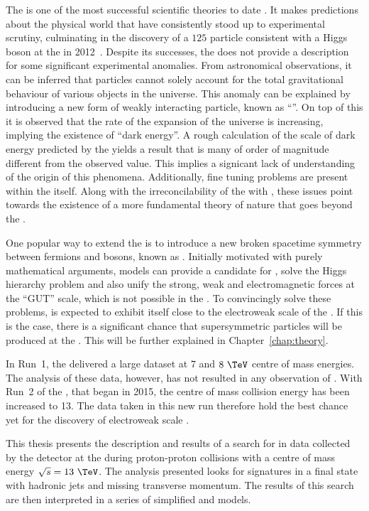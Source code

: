 The \SM is one of the most successful scientific theories to date
\cite{Salam:1964ry,Glashow:1961tr,PhysRevLett.19.1264}. It makes
predictions about the physical world that have consistently stood up
to experimental scrutiny, culminating in the discovery of a $125$\gev
particle consistent with a Higgs boson at the \LHC in
2012~\cite{1207.7214,1207.7235}.  Despite its successes, the \SM does
not provide a description for some significant experimental anomalies.
From astronomical observations, it can be inferred that \SM particles
cannot solely account for the total gravitational behaviour of various
objects in the universe. This anomaly can be explained by introducing
a new form of weakly interacting particle, known as ``\DM''. On top of
this it is observed that the rate of the expansion of the universe is
increasing, implying the existence of ``dark energy''. A rough
calculation of the scale of dark energy predicted by the \SM yields a
result that is many of order of magnitude different from the observed
value. This implies a signicant lack of understanding of the origin of
this phenomena.  Additionally, fine tuning problems are present within
the \SM itself.  Along with the irreconcilability of the \SM with \GR,
these issues point towards the existence of a more fundamental theory
of nature that goes beyond the \SM. 

One popular way to extend the \SM is to introduce a new broken
spacetime symmetry between fermions and bosons, known as
\SUSY. Initially motivated with purely mathematical arguments, \SUSY
models can provide a candidate for \DM, solve the Higgs
hierarchy problem and also unify the strong, weak and electromagnetic
forces at the ``GUT'' scale, which is not possible in the \SM. To
convincingly solve these problems, \SUSY is expected to exhibit itself
close to the electroweak scale of the \SM. If this is the case, there
is a significant chance that supersymmetric particles will be produced
at the \LHC. This will be further explained in
Chapter~\ref{chap:theory}.

In Run~1, the \LHC delivered a large dataset at $7$ and $8~\tev$ centre
of mass energies. The analysis of these data, however, has not
resulted in any observation of \SUSY. With Run~2 of the
\LHC, that began in 2015, the centre of mass collision energy has been 
increased to 13\tev. The data taken in this new run therefore hold the
best chance yet for the discovery of electroweak scale \SUSY.

This thesis presents the description and results of a search
for \SUSY in data collected by the \CMS detector at the \LHC during
proton-proton collisions with a centre of mass energy $\sqrt{s} =
13~\tev$.
The analysis presented looks for \SUSY signatures in a final state
with hadronic jets and missing transverse momentum. The results of
this search are then interpreted in a series of simplified \SUSY and \DM
models.

